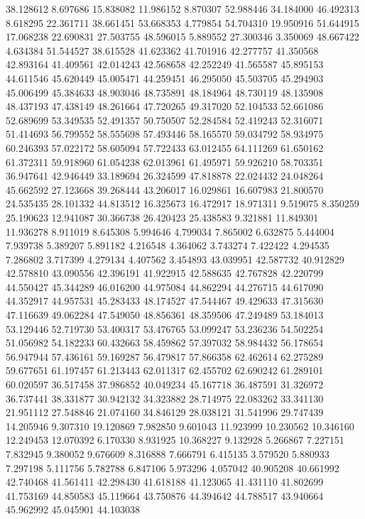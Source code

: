 38.128612
8.697686
15.838082
11.986152
8.870307
52.988446
34.184000
46.492313
8.618295
22.361711
38.661451
53.668353
4.779854
54.704310
19.950916
51.644915
17.068238
22.690831
27.503755
48.596015
5.889552
27.300346
3.350069
48.667422
4.634384
51.544527
38.615528
41.623362
41.701916
42.277757
41.350568
42.893164
41.409561
42.014243
42.568658
42.252249
41.565587
45.895153
44.611546
45.620449
45.005471
44.259451
46.295050
45.503705
45.294903
45.006499
45.384633
48.903046
48.735891
48.184964
48.730119
48.135908
48.437193
47.438149
48.261664
47.720265
49.317020
52.104533
52.661086
52.689699
53.349535
52.491357
50.750507
52.284584
52.419243
52.316071
51.414693
56.799552
58.555698
57.493446
58.165570
59.034792
58.934975
60.246393
57.022172
58.605094
57.722433
63.012455
64.111269
61.650162
61.372311
59.918960
61.054238
62.013961
61.495971
59.926210
58.703351
36.947641
42.946449
33.189694
26.324599
47.818878
22.024432
24.048264
45.662592
27.123668
39.268444
43.206017
16.029861
16.607983
21.800570
24.535435
28.101332
44.813512
16.325673
16.472917
18.971311
9.519075
8.350259
25.190623
12.941087
30.366738
26.420423
25.438583
9.321881
11.849301
11.936278
8.911019
8.645308
5.994646
4.799034
7.865002
6.632875
5.444004
7.939738
5.389207
5.891182
4.216548
4.364062
3.743274
7.422422
4.294535
7.286802
3.717399
4.279134
4.407562
3.454893
43.039951
42.587732
40.912829
42.578810
43.090556
42.396191
41.922915
42.588635
42.767828
42.220799
44.550427
45.344289
46.016200
44.975084
44.862294
44.276715
44.617090
44.352917
44.957531
45.283433
48.174527
47.544467
49.429633
47.315630
47.116639
49.062284
47.549050
48.856361
48.359506
47.249489
53.184013
53.129446
52.719730
53.400317
53.476765
53.099247
53.236236
54.502254
51.056982
54.182233
60.432663
58.459862
57.397032
58.984432
56.178654
56.947944
57.436161
59.169287
56.479817
57.866358
62.462614
62.275289
59.677651
61.197457
61.213443
62.011317
62.455702
62.690242
61.289101
60.020597
36.517458
37.986852
40.049234
45.167718
36.487591
31.326972
36.737441
38.331877
30.942132
34.323882
28.714975
22.083262
33.341130
21.951112
27.548846
21.074160
34.846129
28.038121
31.541996
29.747439
14.205946
9.307310
19.120869
7.982850
9.601043
11.923999
10.230562
10.346160
12.249453
12.070392
6.170330
8.931925
10.368227
9.132928
5.266867
7.227151
7.832945
9.380052
9.676609
8.316888
7.666791
6.415135
3.579520
5.880933
7.297198
5.111756
5.782788
6.847106
5.973296
4.057042
40.905208
40.661992
42.740468
41.561411
42.298430
41.618188
41.123065
41.431110
41.802699
41.753169
44.850583
45.119664
43.750876
44.394642
44.788517
43.940664
45.962992
45.045901
44.103038
